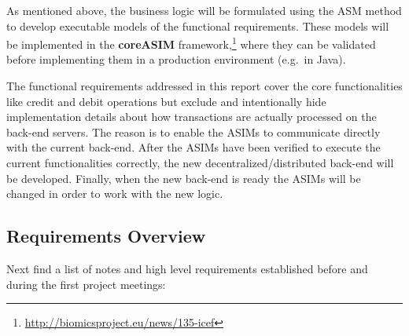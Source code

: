 As mentioned above, the business logic will be formulated using the ASM method  \cite{BoergerStaerk2003} to develop executable models of the functional requirements. These models will be implemented in the \textbf{coreASIM} framework,\footnote{\url{http://biomicsproject.eu/news/135-icef}} where they can be validated before implementing them in a production environment (e.g.\ in Java).

The functional requirements addressed in this report cover the core functionalities like credit and debit operations but exclude and intentionally hide implementation details about how transactions are actually processed on the back-end servers. The reason is to enable the ASIMs to communicate directly with the current back-end. After the ASIMs have been verified to execute the current functionalities correctly, the new decentralized/distributed back-end will be developed. Finally, when the new back-end is ready the ASIMs will be changed in order to work with the new logic.

\subsection{Requirements Overview}\label{_requirements_overview}

Next find a list of notes and high level requirements established before and during the first project meetings:


